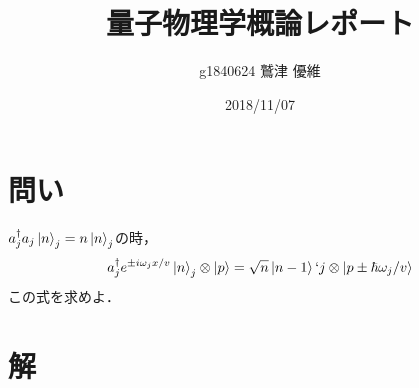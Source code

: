 \documentclass[10pt]{ujarticle}
\title{量子物理学概論レポート}
\author{g1840624 鷲津 優維}
\date{2018/11/07}
\begin{document}
\maketitle
\section{問い}
$a^{\dagger}_j a_j \ket{n}_j = n\ket{n}_j$の時，
\[
a^{\dagger}_j e^{\pm i \omega_j x/v} \ket{n}_j \otimes \ket{p} = \sqrt{n} \ket{n-1}`j \otimes \ket{p \pm \hbar \omega_j /v}
\]
この式を求めよ．

\section{解}
\end{document}
